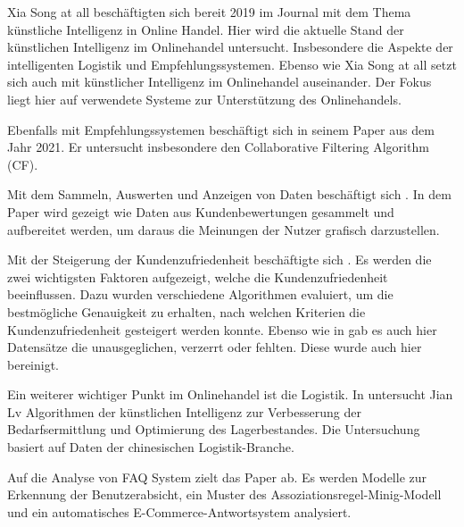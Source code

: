 Xia Song at all beschäftigten sich bereit 2019 im Journal \cite{Song_2019} mit dem Thema künstliche Intelligenz in Online Handel. Hier wird die aktuelle Stand der künstlichen Intelligenz im Onlinehandel untersucht. Insbesondere die Aspekte der intelligenten Logistik und Empfehlungssystemen. Ebenso wie Xia Song at all setzt sich auch \cite{Soni_2020} mit künstlicher Intelligenz im Onlinehandel auseinander. Der Fokus liegt hier auf verwendete Systeme zur Unterstützung des Onlinehandels.\vspace{0.2cm}

Ebenfalls mit Empfehlungssystemen beschäftigt sich \cite{Abdul_Hussien_2021} in seinem Paper aus dem Jahr 2021. Er untersucht insbesondere den Collaborative Filtering Algorithm (CF).\vspace{0.2cm}

Mit dem Sammeln, Auswerten und Anzeigen von Daten beschäftigt sich \cite{Keerthana_2021}. In dem Paper wird gezeigt wie Daten aus Kundenbewertungen gesammelt und aufbereitet werden, um daraus die Meinungen der Nutzer grafisch darzustellen.\vspace{0.2cm}

Mit der Steigerung der Kundenzufriedenheit beschäftigte sich \cite{Wong_2020}. Es werden die zwei wichtigsten Faktoren aufgezeigt, welche die Kundenzufriedenheit beeinflussen. Dazu wurden verschiedene Algorithmen evaluiert, um die bestmögliche Genauigkeit zu erhalten, nach welchen Kriterien die Kundenzufriedenheit gesteigert werden konnte. Ebenso wie in \cite{Keerthana_2021} gab es auch hier Datensätze die unausgeglichen, verzerrt oder fehlten. Diese wurde auch hier bereinigt.\vspace{0.2cm}

Ein weiterer wichtiger Punkt im Onlinehandel ist die Logistik. In \cite{Lv_2021} untersucht Jian Lv Algorithmen der künstlichen Intelligenz zur Verbesserung der Bedarfsermittlung und Optimierung des Lagerbestandes. Die Untersuchung basiert auf Daten der chinesischen Logistik-Branche.\vspace{0.2cm}

Auf die Analyse von FAQ System zielt das Paper \cite{Pan_2018} ab. Es werden Modelle zur Erkennung der Benutzerabsicht, ein Muster des Assoziationsregel-Minig-Modell und ein automatisches E-Commerce-Antwortsystem analysiert.
